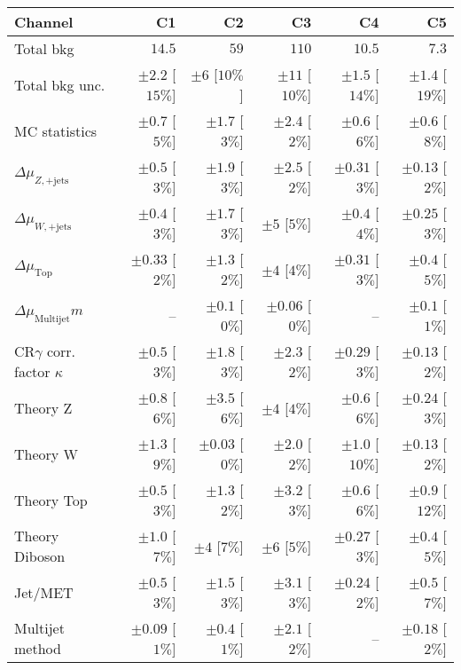 \begin{table}[tbp]
\begin{center}
\begin{tabular}{|lrrrrr|}
\hline
Channel                           & \textbf{ C1 }   & \textbf{ C2 }  & \textbf{ C3 }  & \textbf{ C4 }   & \textbf{ C5 }   \\ \hline
Total bkg                         & $14.5$              & $59$               & $110$              & $10.5$              & $7.3$               \\
Total bkg unc.                    & $\pm 2.2$  [$15\%$] & $\pm 6$  [$10\%$]  & $\pm 11$  [$10\%$] & $\pm 1.5$  [$14\%$] & $\pm 1.4$  [$19\%$] \\
\hline
MC statistics                     & $\pm 0.7$ [$5\%$]   & $\pm 1.7$ [$3\%$]  & $\pm 2.4$ [$2\%$]  & $\pm 0.6$ [$6\%$]   & $\pm 0.6$ [$8\%$]   \\
$\Delta\mu_{Z,\mathrm{+jets}}$    & $\pm 0.5$ [$3\%$]   & $\pm 1.9$ [$3\%$]  & $\pm 2.5$ [$2\%$]  & $\pm 0.31$ [$3\%$]  & $\pm 0.13$ [$2\%$]  \\
$\Delta\mu_{W,\mathrm{+jets}}$    & $\pm 0.4$ [$3\%$]   & $\pm 1.7$ [$3\%$]  & $\pm 5$ [$5\%$]    & $\pm 0.4$ [$4\%$]   & $\pm 0.25$ [$3\%$]  \\
$\Delta\mu_{\mathrm{ Top}}$       & $\pm 0.33$ [$2\%$]  & $\pm 1.3$ [$2\%$]  & $\pm 4$ [$4\%$]    & $\pm 0.31$ [$3\%$]  & $\pm 0.4$ [$5\%$]   \\
$\Delta\mu_{\mathrm{ Multijet}}m$ & --                  & $\pm 0.1$ [$0\%$]  & $\pm 0.06$ [$0\%$] & --                  & $\pm 0.1$ [$1\%$]   \\
CR$\gamma$ corr. factor $\kappa$  & $\pm 0.5$ [$3\%$]   & $\pm 1.8$ [$3\%$]  & $\pm 2.3$ [$2\%$]  & $\pm 0.29$ [$3\%$]  & $\pm 0.13$ [$2\%$]  \\
Theory Z                          & $\pm 0.8$ [$6\%$]   & $\pm 3.5$ [$6\%$]  & $\pm 4$ [$4\%$]    & $\pm 0.6$ [$6\%$]   & $\pm 0.24$ [$3\%$]  \\
Theory W                          & $\pm 1.3$ [$9\%$]   & $\pm 0.03$ [$0\%$] & $\pm 2.0$ [$2\%$]  & $\pm 1.0$ [$10\%$]  & $\pm 0.13$ [$2\%$]  \\
Theory Top                        & $\pm 0.5$ [$3\%$]   & $\pm 1.3$ [$2\%$]  & $\pm 3.2$ [$3\%$]  & $\pm 0.6$ [$6\%$]   & $\pm 0.9$ [$12\%$]  \\
Theory Diboson                    & $\pm 1.0$ [$7\%$]   & $\pm 4$ [$7\%$]    & $\pm 6$ [$5\%$]    & $\pm 0.27$ [$3\%$]  & $\pm 0.4$ [$5\%$]   \\
Jet/MET                           & $\pm 0.5$ [$3\%$]   & $\pm 1.5$ [$3\%$]  & $\pm 3.1$ [$3\%$]  & $\pm 0.24$ [$2\%$]  & $\pm 0.5$ [$7\%$]   \\
Multijet method                   & $\pm 0.09$ [$1\%$]  & $\pm 0.4$ [$1\%$]  & $\pm 2.1$ [$2\%$]  & --                  & $\pm 0.18$ [$2\%$]  \\
\hline
\end{tabular}


\end{center}
\end{table}
